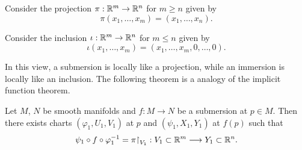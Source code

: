 \begin{example}
  Consider the projection \(\pi:\mathbb{R}^m\to\mathbb{R}^n\) for \(m\geq n\) given by \[
    \pi(x_1,\ldots,x_m) = (x_1,\ldots,x_n).
  \]
\end{example}
\begin{example}
  Consider the inclusion \(\iota:\mathbb{R}^m\to\mathbb{R}^n\) for \(m\leq n\) given by \[
    \iota(x_1,\ldots,x_m) = (x_1,\ldots,x_m,0,\ldots,0).
  \]
\end{example}
In this view, a submersion is locally like a projection, while an immersion is locally like an inclusion. The following theorem is a analogy of the implicit function theorem.
\begin{theorem}
  Let \(M\), \(N\) be smooth manifolds and \(f:M\to N\) be a submersion at \(p\in M\). Then there exists charts \((\varphi_1,U_1,V_1)\) at \(p\) and \((\psi_1,X_1,Y_1)\) at \(f(p)\) such that \[
    \psi_1\circ f\circ\varphi_1^{-1} = \pi\mathord{\upharpoonright}_{V_1}:
    V_1\subset\mathbb{R}^m\longrightarrow Y_1\subset\mathbb{R}^n.
  \]
\end{theorem}
